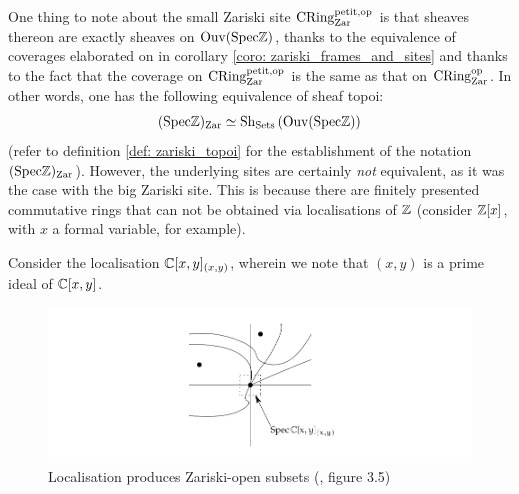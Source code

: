 \begin{remark}
                        One thing to note about the small Zariski site $\mathrm{CRing}^{\mathrm{petit}, \mathrm{op}}_{\mathrm{Zar}}$ is that sheaves thereon are exactly sheaves on $\mathrm{Ouv}(\mathrm{Spec} \mathbb{Z})$, thanks to the equivalence of coverages elaborated on in corollary \ref{coro: zariski_frames_and_sites} and thanks to the fact that the coverage on $\mathrm{CRing}^{\mathrm{petit}, \mathrm{op}}_{\mathrm{Zar}}$ is the same as that on $\mathrm{CRing}^{\mathrm{op}}_{\mathrm{Zar}}$. In other words, one has the following equivalence of sheaf topoi:
                            $$(\mathrm{Spec} \mathbb{Z})_{\mathrm{Zar}} \simeq \mathrm{Sh}_{\mathrm{Sets}}\left(\mathrm{Ouv}(\mathrm{Spec} \mathbb{Z})\right)$$
                        (refer to definition \ref{def: zariski_topoi} for the establishment of the notation $(\mathrm{Spec} \mathbb{Z})_{\mathrm{Zar}}$). However, the underlying sites are certainly \textit{not} equivalent, as it was the case with the big Zariski site. This is because there are finitely presented commutative rings that can not be obtained via localisations of $\mathbb{Z}$ (consider $\mathbb{Z}[x]$, with $x$ a formal variable, for example). 
                    \end{remark}
                    \begin{example}
                        Consider the localisation $\mathbb{C}[x, y]_{(x, y)}$, wherein we note that $(x, y)$ is a prime ideal of $\mathbb{C}[x,y]$. 
                            \begin{figure}[H]
                                \centering
                                \includegraphics[width=\linewidth,height=\textheight,keepaspectratio]{Figures/localisation.png}
                                \caption{Localisation produces Zariski-open subsets (\cite{risingsea}, figure 3.5)}
                                \label{fig: zariski_open_via_localisation}
                            \end{figure}
                    \end{example}
                    
